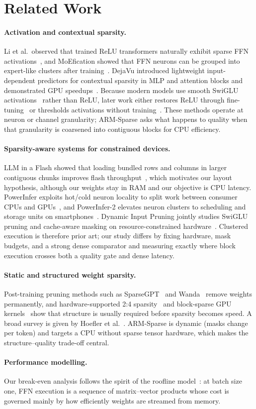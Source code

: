 \section{Related Work}

\paragraph{Activation and contextual sparsity.}
Li et al.\ observed that trained ReLU transformers naturally exhibit sparse
FFN activations~\cite{lazyneuron}, and MoEfication showed that FFN neurons can be
grouped into expert-like clusters after training~\cite{moefication}. DejaVu
introduced lightweight input-dependent predictors for contextual sparsity in
MLP and attention blocks and demonstrated GPU speedups~\cite{dejavu}. Because
modern models use smooth SwiGLU activations~\cite{glu} rather than ReLU,
later work either restores ReLU through fine-tuning~\cite{relustrikes} or
thresholds activations without training~\cite{cats,teal}. These methods
operate at neuron or channel granularity; ARM-Sparse asks what happens to
quality when that granularity is coarsened into contiguous blocks for CPU
efficiency.

\paragraph{Sparsity-aware systems for constrained devices.}
LLM in a Flash showed that loading bundled rows and columns in larger
contiguous chunks improves flash throughput~\cite{llmflash}, which motivates
our layout hypothesis, although our weights stay in RAM and our objective is
CPU latency. PowerInfer exploits hot/cold neuron locality to split work
between consumer CPUs and GPUs~\cite{powerinfer}, and PowerInfer-2 elevates
neuron clusters to scheduling and storage units on smartphones~\cite{powerinfer2}.
Dynamic Input Pruning jointly studies SwiGLU pruning and cache-aware masking on
resource-constrained hardware~\cite{dip}. Clustered execution is therefore
prior art; our study differs by fixing hardware, mask budgets, and a strong
dense comparator and measuring exactly where block execution crosses both a
quality gate and dense latency.

\paragraph{Static and structured weight sparsity.}
Post-training pruning methods such as SparseGPT~\cite{sparsegpt} and
Wanda~\cite{wanda} remove weights permanently, and hardware-supported 2:4
sparsity~\cite{mishra21} and block-sparse GPU kernels~\cite{blocksparse} show
that structure is usually required before sparsity becomes speed. A broad
survey is given by Hoefler et al.~\cite{hoefler}. ARM-Sparse is dynamic
(masks change per token) and targets a CPU without sparse tensor hardware,
which makes the structure--quality trade-off central.

\paragraph{Performance modelling.}
Our break-even analysis follows the spirit of the roofline
model~\cite{roofline}: at batch size one, FFN execution is a sequence of
matrix--vector products whose cost is governed mainly by how efficiently
weights are streamed from memory.
